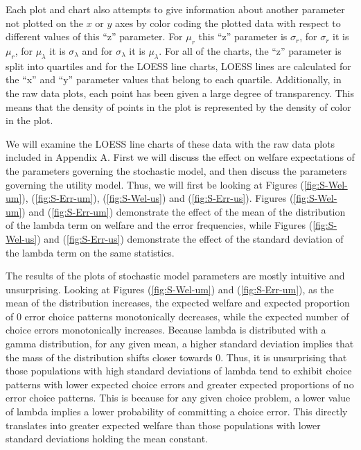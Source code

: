 \documentclass[../main.tex]{subfiles}
\begin{document}
Each plot and chart also attempts to give information about another parameter not plotted on the $x$ or $y$ axes by color coding the plotted data with respect to different values of this \enquote{z} parameter.
For $\mu_r$ this \enquote{z} parameter is $\sigma_r$, for $\sigma_r$ it is $\mu_r$, for $\mu_\lambda$ it is $\sigma_\lambda$ and for $\sigma_\lambda$ it is $\mu_\lambda$.
For all of the charts, the \enquote{z} parameter is split into quartiles and for the LOESS line charts, LOESS lines are calculated for the \enquote{x} and \enquote{y} parameter values that belong to each quartile.
Additionally, in the raw data plots, each point has been given a large degree of transparency.
This means that the density of points in the plot is represented by the density of color in the plot.

We will examine the LOESS line charts of these data with the raw data plots included in Appendix A.
First we will discuss the effect on welfare expectations of the parameters governing the stochastic model, and then discuss the parameters governing the utility model.
Thus, we will first be looking at Figures (\ref{fig:S-Wel-um}), (\ref{fig:S-Err-um}), (\ref{fig:S-Wel-us}) and (\ref{fig:S-Err-us}).
Figures (\ref{fig:S-Wel-um}) and (\ref{fig:S-Err-um}) demonstrate the effect of the mean of the distribution of the lambda term on welfare and the error frequencies, while Figures (\ref{fig:S-Wel-us}) and (\ref{fig:S-Err-us}) demonstrate the effect of the standard deviation of the lambda term on the same statistics.

The results of the plots of stochastic model parameters are mostly intuitive and unsurprising.
Looking at Figures (\ref{fig:S-Wel-um}) and (\ref{fig:S-Err-um}), as the mean of the distribution increases, the expected welfare and expected proportion of 0 error choice patterns monotonically decreases, while the expected number of choice errors monotonically increases.
Because lambda is distributed with a gamma distribution, for any given mean, a higher standard deviation implies that the mass of the distribution shifts closer towards $0$.
Thus, it is unsurprising that those populations with high standard deviations of lambda tend to exhibit choice patterns with lower expected choice errors and greater expected proportions of no error choice patterns.
This is because for any given choice problem, a lower value of lambda implies a lower probability of committing a choice error.{\footnotemark}
This directly translates into greater expected welfare than those populations with lower standard deviations holding the mean constant.
\end{document}
